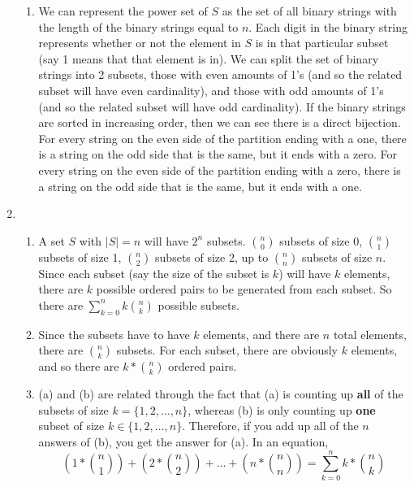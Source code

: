 \documentclass[10pt,english]{article}
\begin{document}
\begin{enumerate}
\begin{enumerate}
    \item We can represent the power set of $S$ as the set of all binary strings with the length of the binary strings equal to $n$. Each digit in the binary string represents whether or not the element in $S$ is in that particular subset (say 1 means that that element is in). We can split the set of binary strings into 2 subsets, those with even amounts of 1's (and so the related subset will have even cardinality), and those with odd amounts of 1's (and so the related subset will have odd cardinality). If the binary strings are sorted in increasing order, then we can see there is a direct bijection. For every string on the even side of the partition ending with a one, there is a string on the odd side that is the same, but it ends with a zero. For every string on the even side of the partition ending with a zero, there is a string on the odd side that is the same, but it ends with a one. 
\pagebreak
\end{enumerate}

\item \begin{enumerate}
    \item A set $S$ with $|S|=n$ will have $2^n$ subsets. ${n\choose0}$ subsets of size 0, ${n\choose1}$ subsets of size 1, ${n\choose 2}$ subsets of size 2, up to ${n\choose n}$ subsets of size $n$. Since each subset (say the size of the subset is $k$) will have $k$ elements, there are $k$ possible ordered pairs to be generated from each subset. So there are $\sum_{k=0}^nk{n\choose k}$ possible subsets. 
    
    \item Since the subsets have to have $k$ elements, and there are $n$ total elements, there are ${n\choose k}$ subsets. For each subset, there are obviously $k$ elements, and so there are $k*{n\choose k}$ ordered pairs. 
    
    \item (a) and (b) are related through the fact that (a) is counting up \textbf{all} of the subsets of size $k=\{1,2,\ldots,n\}$, whereas (b) is only counting up \textbf{one} subset of size $k\in\{1,2,\ldots,n\}$. Therefore, if you add up all of the $n$ answers of (b), you get the answer for (a). In an equation, $$\left(1*{n\choose 1}\right)+\left(2*{n\choose 2}\right)+\ldots+\left(n*{n\choose n}\right)=\sum_{k=0}^nk*{n\choose k}$$
    
\end{enumerate}

\end{enumerate}
\end{document}
